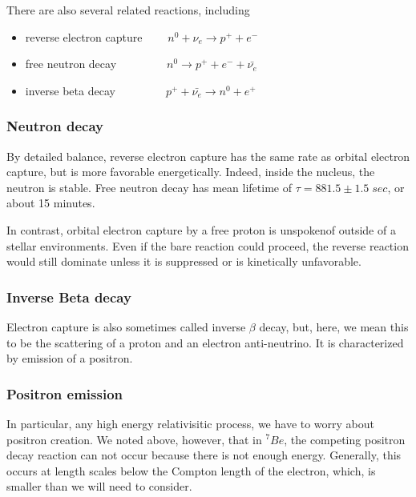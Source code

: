 \documentclass[11pt]{amsart}
\begin{document}
There are also several related reactions, including

\begin{itemize}
\item reverse electron capture  $\;\;\;\;\;\;\;n^{0}+\nu_{e}\rightarrow p^{+}+e^{-}$
\item free neutron decay  $\;\;\;\;\;\;\;\;\;\;\;\;\;\;\;n^{0}\rightarrow p^{+}+e^{-}+\bar{\nu_{e}}$ 
\item inverse beta decay  $\;\;\;\;\;\;\;\;\;\;\;\;\;\;\;p^{+}+\bar{\nu_{e}} \rightarrow n^{0}+e^{+}$
\end{itemize}



\subsubsection{Neutron decay}

By detailed balance,  reverse electron capture has the same rate as orbital electron capture,  but is more favorable energetically.  Indeed, inside the nucleus, the neutron is stable. Free neutron decay has mean lifetime of $\tau=881.5\pm1.5\;sec $, or about 15 minutes. 

In contrast, orbital electron capture by a free proton is unspokenof outside of a stellar environments. Even if the bare reaction could proceed, the reverse reaction would still dominate unless it is suppressed or is kinetically unfavorable. 

\subsubsection{Inverse Beta decay}

Electron capture is also sometimes called inverse $\beta$ decay, but, here, we mean this to be the scattering of a proton and an electron anti-neutrino.  It is characterized by emission of a positron. 

\subsubsection{Positron emission}

In particular, any high energy relativisitic process, we have to worry about positron creation.  We noted above, however, that in $^{7}Be$, the competing positron decay reaction can not occur because there is not enough energy.  Generally, this occurs at length scales below the Compton length of the electron, which, is smaller than we will need to consider.
\end{document}
